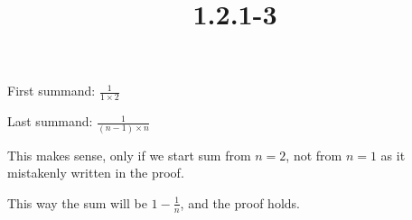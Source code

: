 \documentclass{article}
\title{1.2.1-3}
\begin{document}
\maketitle

First summand: \( \frac{1}{1 \times 2} \)

Last summand: \( \frac{1}{(n-1) \times n} \)

This makes sense, only if we start sum from \( n = 2 \), not from \( n = 1 \) as it mistakenly written in the proof.

This way the sum will be \( 1 - \frac{1}{n} \), and the proof holds.
\end{document}
